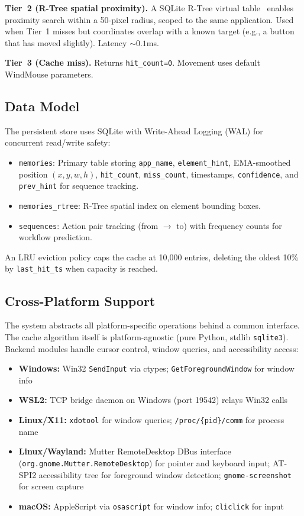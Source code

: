 \documentclass[conference]{IEEEtran}
\begin{document}
\textbf{Tier~2 (R-Tree spatial proximity).} A SQLite R-Tree virtual table~\cite{guttman1984rtree,sqlite_rtree} enables proximity search within a 50-pixel radius, scoped to the same application. Used when Tier~1 misses but coordinates overlap with a known target (e.g., a button that has moved slightly). Latency ${\sim}0.1$ms.

\textbf{Tier~3 (Cache miss).} Returns \texttt{hit\_count=0}. Movement uses default WindMouse parameters.

\subsection{Data Model}

The persistent store uses SQLite with Write-Ahead Logging (WAL) for concurrent read/write safety:

\begin{itemize}[noitemsep,topsep=0pt]
    \item \texttt{memories}: Primary table storing \texttt{app\_name}, \texttt{element\_hint}, EMA-smoothed position $(x, y, w, h)$, \texttt{hit\_count}, \texttt{miss\_count}, timestamps, \texttt{confidence}, and \texttt{prev\_hint} for sequence tracking.
    \item \texttt{memories\_rtree}: R-Tree spatial index on element bounding boxes.
    \item \texttt{sequences}: Action pair tracking (from $\rightarrow$ to) with frequency counts for workflow prediction.
\end{itemize}

An LRU eviction policy caps the cache at 10{,}000 entries, deleting the oldest 10\% by \texttt{last\_hit\_ts} when capacity is reached.

\subsection{Cross-Platform Support}

The system abstracts all platform-specific operations behind a common interface. The cache algorithm itself is platform-agnostic (pure Python, stdlib \texttt{sqlite3}). Backend modules handle cursor control, window queries, and accessibility access:

\begin{itemize}[noitemsep,topsep=0pt]
    \item \textbf{Windows:} Win32 \texttt{SendInput} via ctypes; \texttt{GetForegroundWindow} for window info
    \item \textbf{WSL2:} TCP bridge daemon on Windows (port 19542) relays Win32 calls
    \item \textbf{Linux/X11:} \texttt{xdotool} for window queries; \texttt{/proc/\{pid\}/comm} for process name
    \item \textbf{Linux/Wayland:} Mutter RemoteDesktop DBus interface (\texttt{org.gnome.Mutter.RemoteDesktop}) for pointer and keyboard input; AT-SPI2 accessibility tree for foreground window detection; \texttt{gnome-screenshot} for screen capture
    \item \textbf{macOS:} AppleScript via \texttt{osascript} for window info; \texttt{cliclick} for input
\end{itemize}
\end{document}
